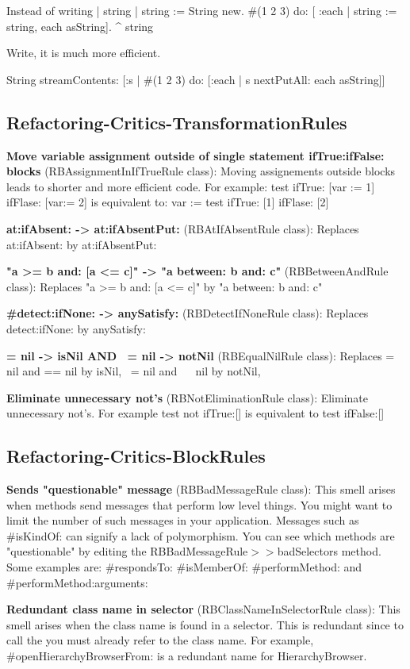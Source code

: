 Instead of writing
	| string | 
	string := String new.
	\#(1 2 3) do: [ :each |
		string := string, each asString].
	^ string

Write, it is much more efficient.

	String streamContents: [:s | 
		\#(1 2 3)  do: [:each | s nextPutAll: each asString]]

\subsection{Refactoring-Critics-TransformationRules}
\textbf{Move variable assignment outside of single statement ifTrue:ifFalse: blocks} (RBAssignmentInIfTrueRule class): Moving assignements outside blocks leads to shorter and more efficient code.
For example:
test 
	ifTrue: [var := 1]
	ifFlase: [var:= 2]
is equivalent to:
var :=  test 
	ifTrue: [1]
	ifFlase: [2]

\textbf{at:ifAbsent: -> at:ifAbsentPut:} (RBAtIfAbsentRule class):  Replaces at:ifAbsent: by at:ifAbsentPut:

\textbf{"a >= b and: [a <= c]" -> "a between: b and: c"} (RBBetweenAndRule class):  Replaces "a >= b and: [a <= c]" by "a between: b and: c"

\textbf{#detect:ifNone: -> anySatisfy:} (RBDetectIfNoneRule class): Replaces detect:ifNone: by anySatisfy:

\textbf{= nil -> isNil AND ~= nil -> notNil} (RBEqualNilRule class): Replaces = nil and == nil by isNil, ~= nil and ~~ nil by notNil, 

\textbf{Eliminate unnecessary not's} (RBNotEliminationRule class): Eliminate unnecessary not's.
For example test not ifTrue:[] is equivalent to test ifFalse:[]

\subsection{Refactoring-Critics-BlockRules}
\textbf{Sends "questionable" message} (RBBadMessageRule class): This smell arises when methods send messages that perform low level things. You might want to limit the number of such messages in your application. Messages such as \#isKindOf: can signify a lack of polymorphism. You can see which methods are "questionable" by editing the RBBadMessageRule$>>$badSelectors method. Some examples are: \#respondsTo: \#isMemberOf: \#performMethod: and \#performMethod:arguments:

\textbf{Redundant class name in selector} (RBClassNameInSelectorRule class): This smell arises when the class name is found in a selector. This is redundant since to call the you must already refer to the class name. For example, \#openHierarchyBrowserFrom: is a redundant name for HierarchyBrowser.

